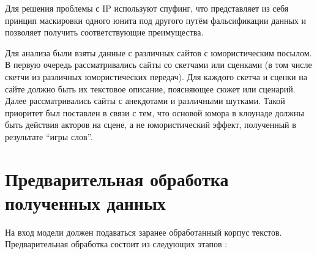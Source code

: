 Для решения проблемы с IP используют спуфинг, что представляет из себя принцип маскировки одного юнита под другого путём фальсификации 
данных и позволяет получить соответствующие преимущества. 

Для анализа были взяты данные с различных сайтов с юмористическим посылом. В первую очередь рассматривались сайты со скетчами или сценками 
(в том числе скетчи из различных юмористических передач). Для каждого скетча и сценки на сайте должно быть их текстовое описание, поясняющее 
сюжет или сценарий. Далее рассматривались сайты с анекдотами и различными шутками. Такой приоритет был поставлен в связи с тем, что основой 
юмора в клоунаде должны быть действия акторов на сцене, а не юмористический эффект, полученный в результате “игры слов”. 

\section{Предварительная обработка полученных данных}

На вход модели должен подаваться заранее обработанный корпус текстов. Предварительная обработка состоит из следующих этапов \cite{seman06}:

